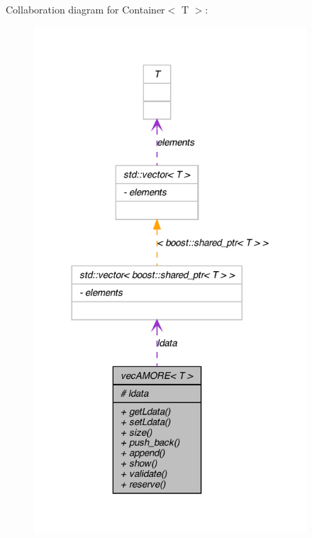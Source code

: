Collaboration diagram for Container$<$ T $>$:\nopagebreak
\begin{figure}[H]
\begin{center}
\leavevmode
\includegraphics[width=288pt]{classvec_a_m_o_r_e__coll__graph}
\end{center}
\end{figure}
